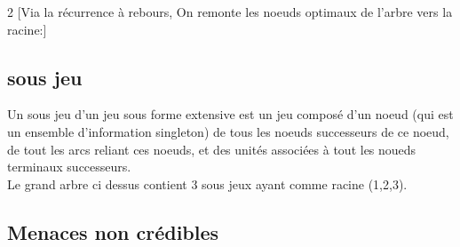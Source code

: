 \begin{multicols}{2}
[Via la récurrence à rebours, On remonte les noeuds optimaux de l'arbre vers la racine:]
\end{multicols}

\subsection{sous jeu}
Un sous jeu d'un jeu sous forme extensive est un jeu composé d'un noeud (qui est un ensemble d'information singleton) de tous les noeuds successeurs de ce noeud, de tout les arcs reliant ces noeuds, et des unités associées à tout les noueds terminaux successeurs.
\\
Le grand arbre ci dessus contient 3 sous jeux ayant comme racine (1,2,3).\\

\pagebreak
\subsection{Menaces non crédibles}

